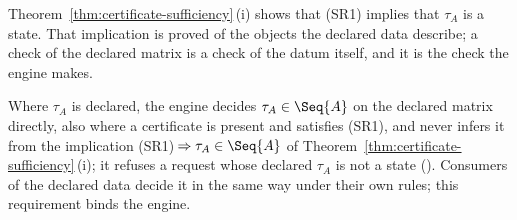 
Theorem~\ref{thm:certificate-sufficiency}\,(i) shows that (SR1) implies that $\tau_A$ is a
state. That implication is proved of the objects the declared data describe;
a check of the declared matrix is a check of the datum itself, and it is the
check the engine makes.

\begin{requirement}\label{req:marginal-decided}
Where $\tau_A$ is declared, the engine decides $\tau_A\in\Seq{A}$ on the
declared matrix directly, also where a certificate is present and satisfies
(SR1), and never infers it from the implication
(SR1)\,$\Rightarrow\tau_A\in\Seq{A}$ of Theorem~\ref{thm:certificate-sufficiency}\,(i); it
refuses a request whose declared $\tau_A$ is not a state
(). Consumers of the declared data
decide it in the same way under their own rules; this requirement binds the
engine.
\end{requirement}
